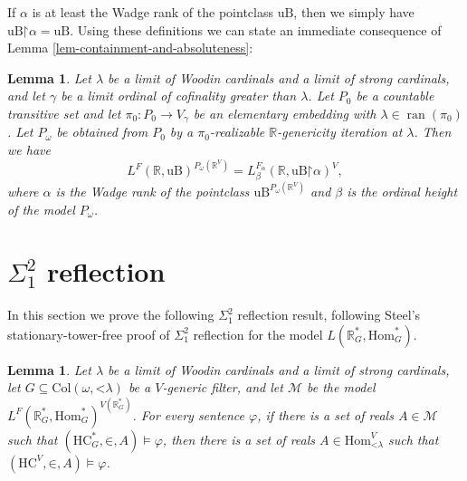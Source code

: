 \documentclass[fleqn, 11pt]{amsart}
\theoremstyle{plain}
\newtheorem{lem}[thm]{Lemma} \newtheorem*{lem*}{Lemma}
\theoremstyle{definition}
\theoremstyle{remark}
\newcommand{\Hom}{\mathrm{Hom}}
\newcommand{\uB}{\mathrm{uB}}
\newcommand{\HC}{\mathrm{HC}}
\newcommand{\ZF}{\mathsf{ZF}}
\newcommand{\Col}{\mathrm{Col}}
\newcommand{\restrict}{\mathord{\restriction}}
\DeclareMathOperator{\ran}{ran}
\begin{document}
If $\alpha$ is at least the Wadge rank of the pointclass $\uB$, then we simply have $\uB \restrict \alpha = \uB$. 
Using these definitions we can state an immediate consequence of Lemma \ref{lem-containment-and-absoluteness}:

\begin{lem}\label{lem-DM-of-P-omega}
 Let $\lambda$ be a limit of Woodin cardinals and a limit of strong cardinals, and let $\gamma$ be a limit ordinal of cofinality greater than $\lambda$.  Let $P_{0}$ be a countable transitive set and let $\pi_0 \colon P_0 \to V_{\gamma}$ be an elementary embedding with $\lambda \in \ran(\pi_0)$. Let $P_\omega$ be obtained from $P_0$ by a $\pi_0$-realizable $\mathbb{R}$-genericity iteration at $\lambda$. Then we have
 \[ L^F(\mathbb{R}, \uB)^{P_\omega(\mathbb{R}^V)} = L_\beta^{F_\alpha}(\mathbb{R}, \uB\restrict \alpha)^V,\]
 where $\alpha$ is the Wadge rank of the pointclass $\uB^{P_\omega(\mathbb{R}^V)}$ and $\beta$ is the ordinal height of the model $P_\omega$.
\end{lem}




\section{$\Sigma^2_1$ reflection}\label{sec-sigma-2-1-reflection}

In this section we prove the following $\Sigma^2_1$ reflection result, following Steel's stationary-tower-free proof \cite{SteSTFree} of $\Sigma^2_1$ reflection for the model $L(\mathbb{R}^*_G, \Hom^*_G)$.

\begin{lem}\label{lem-Sigma-2-1-reflection}
 Let $\lambda$ be a limit of Woodin cardinals and a limit of strong cardinals, let $G \subseteq \Col(\omega,\mathord{<}\lambda)$ be a $V$-generic filter, and let $\mathcal{M}$ be the model $L^F(\mathbb{R}^*_G, \Hom^*_G)^{V(\mathbb{R}^*_G)}$. For every sentence $\varphi$, if there is a set of reals $A\in \mathcal{M}$ such that $(\HC^*_G,\mathord{\in},A) \models \varphi$, then there is a set of reals $A \in \Hom_{\mathord{<}\lambda}^V$ such that $(\HC^{V},\mathord{\in},A) \models \varphi$.
\end{lem}
\end{document}
